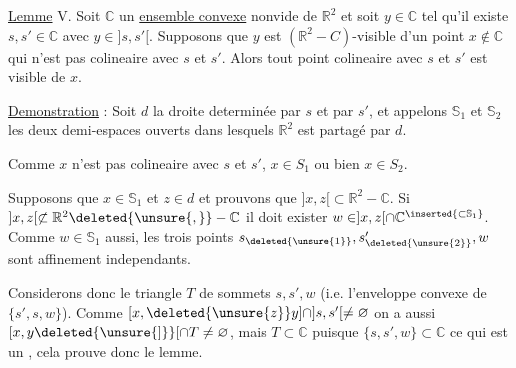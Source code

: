 \deleted{$]z,x]\subset\mathbb{R}^{2}-\mathbb{C}$, c.q.f.d.}

\uline{Lemme} V. Soit $\mathbb{C}$ un \uline{ensemble convexe} nonvide de $\mathbb{R}^{2}$ et soit $y\in\mathbb{C}$ tel qu'il existe $s,s'\in\mathbb{C}$ avec $y\in ]s,s'[$. Supposons que $y$ est $(\mathbb{R}^{2}-C)$-visible d'un point $x\notin\mathbb{C}$ qui n'est pas colineaire avec $s$ et $s'$. Alors tout point colineaire avec $s$ et $s'$ est visible de $x$.


\uline{Demonstration} : Soit $d$ la droite determinée par $s$ et par $s'$, et appelons $\mathbb{S}_{1}$ et $\mathbb{S}_{2}$ les deux demi-espaces ouverts dans lesquels $\mathbb{R}^{2}$ est partagé par $d$.

Comme $x$ n'est pas colineaire avec $s$ et $s'$,  $x\in S_{1}$ ou bien $x\in S_{2}$.

Supposons que $x\in\mathbb{S}_{1}$ et $z\in d$ et prouvons que $]x,z[\subset\mathbb{R}^{2}-\mathbb{C}$. Si $]x,z[\not\subset\mathbb{R}^{2}\deleted{\unsure{,}}-\mathbb{C}$ il doit exister $w\in ]x,z[\cap\mathbb{C}{}^{\inserted{\subset\mathbb{S}_{1}}}$. Comme $w\in\mathbb{S}_{1}$ aussi, les trois points $s_{\deleted{\unsure{1}}},s_{\deleted{\unsure{2}}}',w$ sont affinement independants.

Considerons donc le triangle $T$ de sommets $s,s',w$ (i.e. l'enveloppe convexe de $\{s',s,w\}$). Comme $[x,\deleted{\unsure{z}}y]\cap ]s,s'[\ne\varnothing$ on a aussi $[x,y\deleted{\unsure{]}}[\cap T\ne\varnothing$, mais $T\subset\mathbb{C}$ puisque $\{s,s',w\}\subset\mathbb{C}$ ce qui est un  \inserted{puisque on suppose $[x,y[\cap\mathbb{C}=\varnothing$}, cela prouve donc le lemme.

